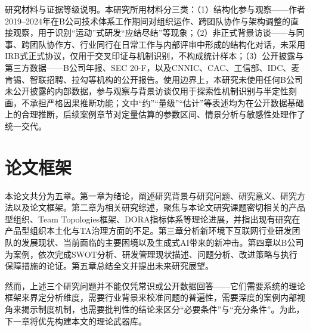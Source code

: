 研究材料与证据等级说明。本研究所用材料分三类：（1）结构化参与观察——作者2019--2024年在B公司技术体系工作期间对组织运作、跨团队协作与架构调整的直接观察，用于识别“运动”式研发“应结尽结”等现象；（2）非正式背景访谈——与同事、跨团队协作方、行业同行在日常工作与内部评审中形成的结构化对话，未采用IRB式正式协议，仅用于交叉印证与机制识别，不构成统计样本；（3）公开披露与第三方数据——B公司年报、SEC 20-F，以及CNNIC、CAC、工信部、IDC、麦肯锡、智联招聘、拉勾等机构的公开报告。使用边界上，本研究未使用任何B公司未公开披露的内部数据，参与观察与背景访谈仅用于探索性机制识别与半定性刻画，不承担严格因果推断功能；文中“约”“量级”“估计”等表述均为在公开数据基础上的合理推断，后续案例章节对定量估算的参数区间、情景分析与敏感性处理作了统一交代。

\section{论文框架}

本论文共分为五章。第一章为绪论，阐述研究背景与研究问题、研究意义、研究方法以及论文框架。第二章为相关研究综述，聚焦与本论文研究课题密切相关的产品型组织、Team Topologies框架、DORA指标体系等理论进展，并指出现有研究在产品型组织本土化与TA治理方面的不足。第三章分析新环境下互联网行业研发团队的发展现状、当前面临的主要困境以及生成式AI带来的新冲击。第四章以B公司为案例，依次完成SWOT分析、研发管理现状描述、问题分析、改进策略与执行保障措施的论证。第五章总结全文并提出未来研究展望。

然而，上述三个研究问题并不能仅凭常识或公开数据回答——它们需要系统的理论框架来界定分析维度，需要行业背景来校准问题的普遍性，需要深度的案例内部视角来揭示制度机制，也需要批判性的结论来区分“必要条件”与“充分条件”。为此，下一章将优先构建本文的理论武器库。
